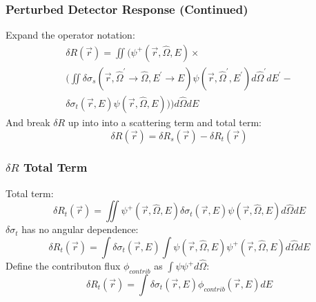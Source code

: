 \documentclass[t]{beamer}
\begin{document}
\begin{frame}
  \frametitle{Perturbed Detector Response (Continued)}
  Expand the operator notation:
  \begin{multline}
    \delta R\left(\vec{r}\right) =
    \iint\Biggl(\psi^+\left(\vec{r},\hat{\Omega},E\right) \times \\
    \Biggl(\iint\delta\sigma_s\left(\vec{r},\hat{\Omega}^\prime\rightarrow\hat{\Omega},E^\prime\rightarrow E\right)\psi\left(\vec{r},\hat{\Omega}^\prime,E^\prime\right)d\hat{\Omega}^\prime dE^\prime - \\
    \delta\sigma_t\left(\vec{r},E\right)\psi\left(\vec{r},\hat{\Omega},E\right)\Biggr)\Biggr)d\hat{\Omega}dE
  \end{multline}
  And break $\delta R$ up into into a scattering term and total term:
  \begin{equation}
    \delta R\left(\vec{r}\right) =
    \delta R_s\left(\vec{r}\right) -
    \delta R_t\left(\vec{r}\right)
  \end{equation}
\end{frame}

\begin{frame}
  \frametitle{$\delta R$ Total Term}
  Total term:
  \begin{equation}
    \delta R_t\left(\vec{r}\right) =
    \iint\psi^+\left(\vec{r},\hat{\Omega},E\right)\delta\sigma_t\left(\vec{r},E\right)\psi\left(\vec{r},\hat{\Omega},E\right)d\hat{\Omega}dE
  \end{equation}
  $\delta\sigma_t$ has no angular dependence:
  \begin{equation}
    \delta R_t\left(\vec{r}\right) =
    \int\delta\sigma_t\left(\vec{r},E\right)\int\psi\left(\vec{r},\hat{\Omega},E\right)\psi^+\left(\vec{r},\hat{\Omega},E\right)d\hat{\Omega}dE
  \end{equation}
  Define the contributon flux $\phi_{contrib}$ as $\int\psi\psi^+d\hat{\Omega}$:
  \begin{equation}\boxed{
    \delta R_t\left(\vec{r}\right) =
    \int\delta\sigma_t\left(\vec{r},E\right)\phi_{contrib}\left(\vec{r},E\right)dE
  }\end{equation}
\end{frame}
\end{document}
